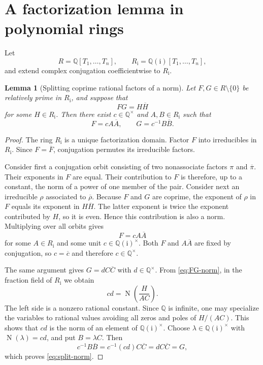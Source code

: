 \documentclass[11pt,a4paper]{article}
\numberwithin{equation}{section}
\newtheorem{lemma}[theorem]{Lemma}
\theoremstyle{definition}
\newcommand{\Q}{\mathbb Q}
\newcommand{\ii}{\mathrm i}
\newcommand{\N}{\operatorname N}
\newcommand{\ol}[1]{\overline{#1}}
\begin{document}
\section{A factorization lemma in polynomial rings}
\label{sec:factorization-lemma}

Let
\[
 R=\Q[T_1,\ldots,T_n],
 \qquad
 R_{\ii}=\Q(\ii)[T_1,\ldots,T_n],
\]
and extend complex conjugation coefficientwise to $R_{\ii}$.

\begin{lemma}[Splitting coprime rational factors of a norm]
\label{lem:coprime-norm-factors}
Let $F,G\in R\setminus\{0\}$ be relatively prime in $R_{\ii}$, and suppose
that
\begin{equation}
 FG=H\ol H
 \label{eq:FG-norm}
\end{equation}
for some $H\in R_{\ii}$.  Then there exist
$c\in\Q^\times$ and $A,B\in R_{\ii}$ such that
\begin{equation}
 F=cA\ol A,
 \qquad
 G=c^{-1}B\ol B.
 \label{eq:split-norm}
\end{equation}
\end{lemma}

\begin{proof}
The ring $R_{\ii}$ is a unique factorization domain.  Factor $F$ into
irreducibles in $R_{\ii}$.  Since $F=\ol F$, conjugation permutes its
irreducible factors.

Consider first a conjugation orbit consisting of two nonassociate factors
$\pi$ and $\ol\pi$.  Their exponents in $F$ are equal.  Their contribution to
$F$ is therefore, up to a constant, the norm of a power of one member of the
pair.  Consider next an irreducible $\rho$ associated to $\ol\rho$.  Because
$F$ and $G$ are coprime, the exponent of $\rho$ in $F$ equals its exponent in
$H\ol H$.  The latter exponent is twice the exponent contributed by $H$,
so it is even.  Hence this contribution is also a norm.  Multiplying over all
orbits gives
\[
 F=cA\ol A
\]
for some $A\in R_{\ii}$ and some unit $c\in\Q(\ii)^\times$.  Both $F$ and
$A\ol A$ are fixed by conjugation, so $c=\ol c$ and therefore
$c\in\Q^\times$.

The same argument gives $G=dC\ol C$ with $d\in\Q^\times$.  From
\eqref{eq:FG-norm}, in the fraction field of $R_{\ii}$ we obtain
\[
 cd=\N\!\left(\frac{H}{AC}\right).
\]
The left side is a nonzero rational constant.  Since $\Q$ is infinite, one
may specialize the variables to rational values avoiding all zeros and poles
of $H/(AC)$.  This shows that $cd$ is the norm of an element of
$\Q(\ii)^\times$.  Choose $\lambda\in\Q(\ii)^\times$ with
$\N(\lambda)=cd$, and put $B=\lambda C$.  Then
\[
 c^{-1}B\ol B=c^{-1}(cd)C\ol C=dC\ol C=G,
\]
which proves \eqref{eq:split-norm}.
\end{proof}
\end{document}
